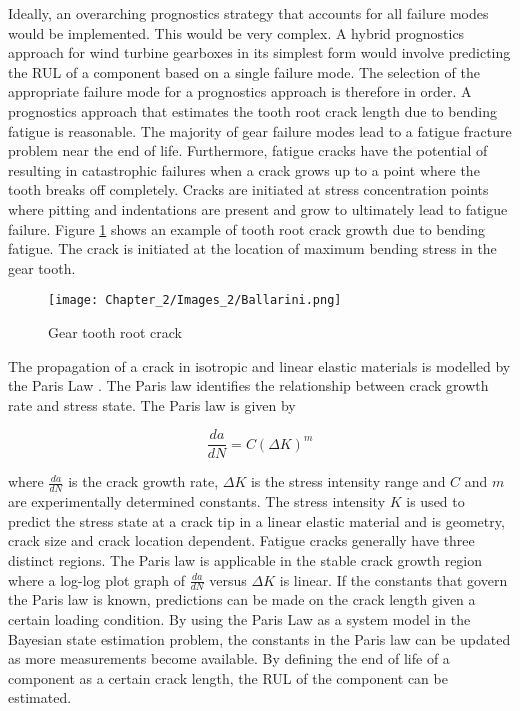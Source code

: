 Ideally, an overarching prognostics strategy that accounts for all failure modes would be implemented. This would be very complex. A hybrid prognostics approach for wind turbine gearboxes in its simplest form would involve predicting the RUL of a component based on a single failure mode. The selection of the appropriate failure mode for a prognostics approach is therefore in order. A prognostics approach that estimates the tooth root crack length due to bending fatigue is reasonable. The majority of gear failure modes lead to a fatigue fracture problem near the end of life. Furthermore, fatigue cracks have the potential of resulting in catastrophic failures when a crack grows up to a point where the tooth breaks off completely. Cracks are initiated at stress concentration points where pitting and indentations are present and grow to ultimately lead to fatigue failure. Figure \ref{F:Ballarini} shows an example of tooth root crack growth due to bending fatigue. The crack is initiated at the location of maximum bending stress in the gear tooth.

\begin{figure}[H]
	\centering
	\texttt{[image: Chapter\_2/Images\_2/Ballarini.png]}
	\caption{Gear tooth root crack \citep{Ballarini1997}}
	\label{F:Ballarini}
\end{figure}


The propagation of a crack in isotropic and linear elastic materials is modelled by the Paris Law \citep{Paris1963}. The Paris law identifies the relationship between crack growth rate and stress state. The Paris law is given by 

\begin{equation}
\frac{d a}{d N}=C(\Delta K)^{m}
\end{equation}

where $\frac{d a}{d N}$ is the crack growth rate, $\Delta K$ is the stress intensity range and $C$ and $m$ are experimentally determined constants. The stress intensity $K$ is used to predict the stress state at a crack tip in a linear elastic material and is geometry, crack size and crack location dependent. Fatigue cracks generally have three distinct regions. The Paris law is applicable in the stable crack growth region where a log-log plot graph of $\frac{d a}{d N}$ versus $\Delta K$ is linear. If the constants that govern the Paris law is known, predictions can be made on the crack length given a certain loading condition. By using the Paris Law as a system model in the Bayesian state estimation problem, the constants in the Paris law can be updated as more measurements become available. By defining the end of life of a component as a certain crack length, the RUL of the component can be estimated. 





